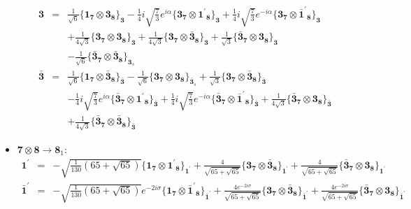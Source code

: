 \documentclass[english]{article}
\newcommand{\subcg}[3]{\big\{ {#1}\otimes{#2}\big\}^{}_{#3}}
\newcommand{\rep}[1]{\mathbf{#1}}
\begin{document}
\begin{itemize}
\begin{eqnarray*}
\\
\rep{3} &=& \frac{1}{\sqrt{6}}\subcg{\rep{1}_{\rep{7}}}{\rep{3}_{\rep{8}}}{\rep{3}}-\frac{1}{4} i \sqrt{\frac{7}{3}} e^{i \alpha }\subcg{\rep{3}_{\rep{7}}}{\rep{1^{\prime}}_{\rep{8}}}{\rep{3}}+\frac{1}{4} i \sqrt{\frac{7}{3}} e^{-i \alpha }\subcg{\rep{3}_{\rep{7}}}{\rep{\bar{1}^{\prime}}_{\rep{8}}}{\rep{3}} \\ 
 & & +\frac{1}{4 \sqrt{3}}\subcg{\rep{3}_{\rep{7}}}{\rep{3}_{\rep{8}}}{\rep{3}}+\frac{1}{4 \sqrt{3}}\subcg{\rep{3}_{\rep{7}}}{\rep{\bar{3}}_{\rep{8}}}{\rep{3}}+\frac{1}{\sqrt{3}}\subcg{\rep{\bar{3}}_{\rep{7}}}{\rep{3}_{\rep{8}}}{\rep{3}} \\ 
 & & -\frac{1}{\sqrt{6}}\subcg{\rep{\bar{3}}_{\rep{7}}}{\rep{\bar{3}}_{\rep{8}}}{\rep{3}_{s}}
\\
\rep{\bar{3}} &=& \frac{1}{\sqrt{6}}\subcg{\rep{1}_{\rep{7}}}{\rep{\bar{3}}_{\rep{8}}}{\rep{\bar{3}}}-\frac{1}{\sqrt{6}}\subcg{\rep{3}_{\rep{7}}}{\rep{3}_{\rep{8}}}{\rep{\bar{3}}_{s}}+\frac{1}{\sqrt{3}}\subcg{\rep{3}_{\rep{7}}}{\rep{\bar{3}}_{\rep{8}}}{\rep{\bar{3}}} \\ 
 & & -\frac{1}{4} i \sqrt{\frac{7}{3}} e^{i \alpha }\subcg{\rep{\bar{3}}_{\rep{7}}}{\rep{1^{\prime}}_{\rep{8}}}{\rep{\bar{3}}}+\frac{1}{4} i \sqrt{\frac{7}{3}} e^{-i \alpha }\subcg{\rep{\bar{3}}_{\rep{7}}}{\rep{\bar{1}^{\prime}}_{\rep{8}}}{\rep{\bar{3}}}+\frac{1}{4 \sqrt{3}}\subcg{\rep{\bar{3}}_{\rep{7}}}{\rep{3}_{\rep{8}}}{\rep{\bar{3}}} \\ 
 & & +\frac{1}{4 \sqrt{3}}\subcg{\rep{\bar{3}}_{\rep{7}}}{\rep{\bar{3}}_{\rep{8}}}{\rep{\bar{3}}}
\end{eqnarray*}
\item $\rep{7}\otimes\rep{8}\to\rep{8}_{1}$:
\begin{eqnarray*}
\rep{1^{\prime}} &=& -\sqrt{\frac{1}{130} \left(65+\sqrt{65}\right)}\subcg{\rep{1}_{\rep{7}}}{\rep{1^{\prime}}_{\rep{8}}}{\rep{1^{\prime}}}+\frac{4}{\sqrt{65+\sqrt{65}}}\subcg{\rep{3}_{\rep{7}}}{\rep{\bar{3}}_{\rep{8}}}{\rep{1^{\prime}}}+\frac{4}{\sqrt{65+\sqrt{65}}}\subcg{\rep{\bar{3}}_{\rep{7}}}{\rep{3}_{\rep{8}}}{\rep{1^{\prime}}}
\\
\rep{\bar{1}^{\prime}} &=& -\sqrt{\frac{1}{130} \left(65+\sqrt{65}\right)} e^{-2 i \sigma }\subcg{\rep{1}_{\rep{7}}}{\rep{\bar{1}^{\prime}}_{\rep{8}}}{\rep{\bar{1}^{\prime}}}+\frac{4 e^{-2 i \sigma }}{\sqrt{65+\sqrt{65}}}\subcg{\rep{3}_{\rep{7}}}{\rep{\bar{3}}_{\rep{8}}}{\rep{\bar{1}^{\prime}}}+\frac{4 e^{-2 i \sigma }}{\sqrt{65+\sqrt{65}}}\subcg{\rep{\bar{3}}_{\rep{7}}}{\rep{3}_{\rep{8}}}{\rep{\bar{1}^{\prime}}}

\end{eqnarray*}
\end{itemize}
\end{document}
